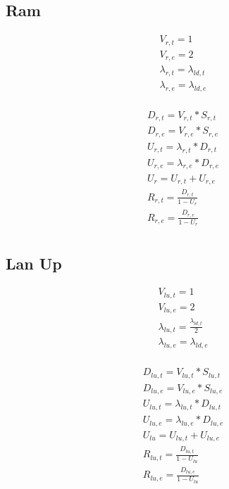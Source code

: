 \documentclass[11pt]{article}
\begin{document}
\subsection{Ram}

\begin{equation}
    \begin{array}{l}
        V_{r, t} = 1 \\
        V_{r, e} = 2 \\ %
        \lambda_{r, t} = \lambda_{ld, t} \\
        \lambda_{r, e} = \lambda_{ld, e} \\
    \end{array}
\end{equation}

\begin{equation}
    \begin{array}{l}
        D_{r, t} = V_{r, t} * S_{r, t} \\
        D_{r, e} = V_{r, e} * S_{r, e} \\
        U_{r, t} = \lambda_{r, t} * D_{r, t} \\
        U_{r, e} = \lambda_{r, e} * D_{r, e} \\
        U_{r} = U_{r, t} + U_{r, e} \\
        R_{r, t} = \frac{D_{r, t}}{1 - U_{r}} \\
        R_{r, e} = \frac{D_{r, e}}{1 - U_{r}} \\
    \end{array}
\end{equation}

\subsection{Lan Up}

\begin{equation}
    \begin{array}{l}
        V_{lu, t} = 1 \\
        V_{lu, e} = 2 \\ %
        \lambda_{lu, t} = \frac{\lambda_{ld, t}}{2} \\ %
        \lambda_{lu, e} = \lambda_{ld, e} \\
    \end{array}
\end{equation}

\begin{equation}
    \begin{array}{l}
        D_{lu, t} = V_{lu, t} * S_{lu, t} \\
        D_{lu, e} = V_{lu, e} * S_{lu, e} \\
        U_{lu, t} = \lambda_{lu, t} * D_{lu, t} \\
        U_{lu, e} = \lambda_{lu, e} * D_{lu, e} \\
        U_{lu} = U_{lu, t} + U_{lu, e} \\
        R_{lu, t} = \frac{D_{lu, t}}{1 - U_{lu}} \\
        R_{lu, e} = \frac{D_{lu, e}}{1 - U_{lu}} \\
    \end{array}
\end{equation}
\end{document}
